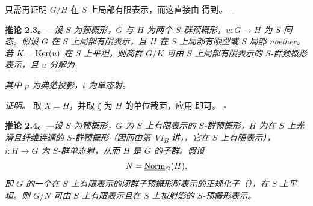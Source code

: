 只需再证明 \(G/H\) 在 \(S\) 上局部有限表示，而这直接由 得到。
\hfill\(\square\)

\medskip
\noindent{}%
\textbf{推论 2.3。}---\textit{设 \(S\) 为预概形，\(G\) 与 \(H\) 为两个 \(S\)-群预概形，\(u:G\to H\) 为 \(S\)-同态。假设 \(G\) 在 \(S\) 上局部有限表示，且 \(H\) 在 \(S\) 上局部有限型或 \(S\) 局部 noether。若 \(K=\operatorname{Ker}(u)\) 在 \(S\) 上平坦，则商群 \(G/K\) 可由 \(S\) 上局部有限表示的 \(S\)-群预概形表示，且 \(u\) 分解为}
\begin{center}
\end{center}
\textit{其中 \(p\) 为典范投影，\(i\) 为单态射。}

\medskip
\noindent\textit{证明。}
取 \(X=H\)，并取 \(\xi\) 为 \(H\) 的单位截面，应用  即可。
\hfill\(\square\)

\medskip
\noindent{}%
\textbf{推论 2.4。}---\textit{设 \(S\) 为预概形，\(G\) 为 \(S\) 上有限表示的 \(S\)-群预概形，\(H\) 为在 \(S\) 上光滑且纤维连通的 \(S\)-群预概形（因而由第 VI\textsubscript{B} 讲，，它在 \(S\) 上有限表示），\(i:H\to G\) 为 \(S\)-群单态射，从而 \(H\) 是 \(G\) 的子群。假设}
\[
  N=\underline{\operatorname{Norm}}_G(H),
\]
\textit{即 \(G\) 的一个在 \(S\) 上有限表示的闭群子预概形所表示的正规化子（），在 \(S\) 上平坦。则 \(G/N\) 可由 \(S\) 上有限表示且在 \(S\) 上拟射影的 \(S\)-预概形表示。}

